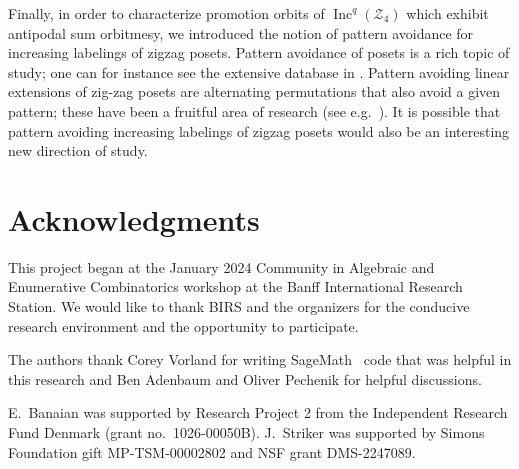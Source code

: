 \documentclass[11pt]{amsart}
\theoremstyle{definition}
\DeclareMathOperator{\Inc}{\mathrm{Inc}}
\newcommand{\calZ}{\mathcal{Z}}
\begin{document}
Finally, in order to characterize promotion orbits of $\Inc^q(\calZ_4)$ which exhibit antipodal sum orbitmesy, we introduced the notion of pattern avoidance for increasing labelings of zigzag posets. Pattern avoidance of posets is a rich topic of study; one can for instance see the extensive database in \cite{PatternDatabase}. 
Pattern avoiding linear extensions of zig-zag posets are alternating permutations that also avoid a given pattern; these have been a fruitful area of research (see e.g.~\cite{Lewis2011,Yan2013}). It is possible that pattern avoiding increasing labelings of zigzag posets would also be an interesting new direction of study.

\section*{Acknowledgments}
This project began at the January 2024 Community in Algebraic and Enumerative Combinatorics workshop at the Banff International Research Station. We would like to thank BIRS and the organizers for the conducive research environment and the opportunity to participate.

The authors thank Corey Vorland for writing  SageMath~\cite{sagemath} code  that was helpful in this research and Ben Adenbaum and Oliver Pechenik for helpful discussions. 

E.~Banaian was supported by Research Project 2 from the Independent Research Fund Denmark (grant no.~1026-00050B).
J.~Striker was supported by Simons Foundation gift MP-TSM-00002802 and NSF grant DMS-2247089.




\end{document}
